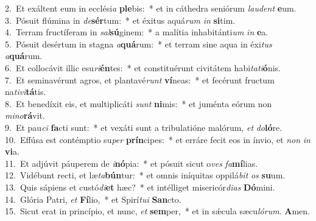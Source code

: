 {2.~}Et exáltent eum in ecclési\textit{a} \textbf{ple}bis:~* et in cáthedra seniórum \textit{lau}\textit{dent} \textbf{e}um.\\
{3.~}Pósuit flúmina in \textit{de}\textbf{sér}tum:~* et éxitus aquá\textit{rum} \textit{in} \textbf{si}tim.\\
{4.~}Terram fructíferam in \textit{sal}\textbf{sú}ginem:~* a malítia inhabitánti\textit{um} \textit{in} \textbf{e}a.\\
{5.~}Pósuit desértum in stagna \textit{a}\textbf{quá}rum:~* et terram sine aqua in éxi\textit{tus} \textit{a}\textbf{quá}rum.\\
{6.~}Et collocávit illic esu\textit{ri}\textbf{én}tes:~* et constituérunt civitátem habi\textit{ta}\textit{ti}\textbf{ó}nis.\\
{7.~}Et seminavérunt agros, et plantavé\textit{runt} \textbf{ví}neas:~* et fecérunt fructum na\textit{ti}\textit{vi}\textbf{tá}tis.\\
{8.~}Et benedíxit eis, et multiplicáti \textit{sunt} \textbf{ni}mis:~* et juménta eórum non \textit{mi}\textit{no}\textbf{rá}vit.\\
{9.~}Et pau\textit{ci} \textbf{fa}cti sunt:~* et vexáti sunt a tribulatióne malórum, \textit{et} \textit{do}\textbf{ló}re.\\
{10.~}Effúsa est contémptio su\textit{per} \textbf{prín}cipes:~* et erráre fecit eos in ínvio, et \textit{non} \textit{in} \textbf{vi}a.\\
{11.~}Et adjúvit páuperem de \textit{i}\textbf{nó}pia:~* et pósuit sicut o\textit{ves} \textit{fa}\textbf{mí}lias.\\
{12.~}Vidébunt recti, et læ\textit{ta}\textbf{bún}tur:~* et omnis iníquitas oppilá\textit{bit} \textit{os} \textbf{su}um.\\
{13.~}Quis sápiens et custó\textit{di}\textbf{et} hæc?~* et intélliget misericór\textit{di}\textit{as} \textbf{Dó}mini.\\
{14.~}Glória Patri, \textit{et} \textbf{Fí}lio,~* et Spirí\textit{tu}\textit{i} \textbf{San}cto.\\
{15.~}Sicut erat in princípio, et nunc, \textit{et} \textbf{sem}per,~* et in sǽcula sæcu\textit{ló}\textit{rum}. \textbf{A}men.\\
